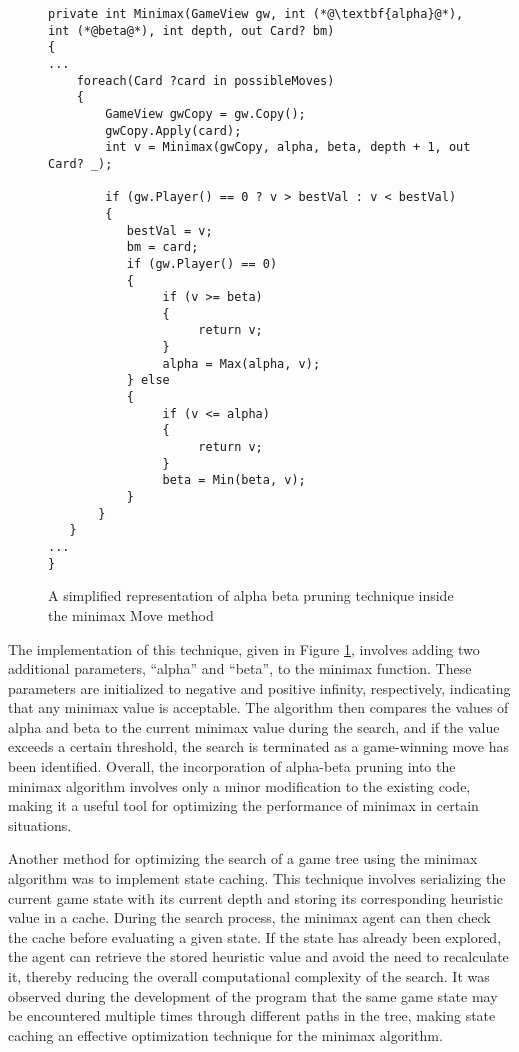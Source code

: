 \begin{figure}[h]
\captionsetup{justification=centering}
\begin{lstlisting}[frame=single]
private int Minimax(GameView gw, int (*@\textbf{alpha}@*), int (*@beta@*), int depth, out Card? bm)
{
...
    foreach(Card ?card in possibleMoves)
    {
        GameView gwCopy = gw.Copy();
        gwCopy.Apply(card);
        int v = Minimax(gwCopy, alpha, beta, depth + 1, out Card? _);

        if (gw.Player() == 0 ? v > bestVal : v < bestVal)
        {
           bestVal = v;
           bm = card;
           if (gw.Player() == 0)
           {
                if (v >= beta)
                {
                     return v;
                }
                alpha = Max(alpha, v);
           } else
           {
                if (v <= alpha)
                {
                     return v;
                }
                beta = Min(beta, v);
           }
       }
   }
...
}
\end{lstlisting}
\caption{A simplified representation of alpha beta pruning technique inside the minimax Move method}
\label{fig:alphabeta}
\end{figure}

The implementation of this technique, given in Figure \ref{fig:alphabeta}, involves adding two additional parameters, ``alpha'' and ``beta'', to the minimax function. These parameters are initialized to negative and positive infinity, respectively, indicating that any minimax value is acceptable. The algorithm then compares the values of alpha and beta to the current minimax value during the search, and if the value exceeds a certain threshold, the search is terminated as a game-winning move has been identified. Overall, the incorporation of alpha-beta pruning into the minimax algorithm involves only a minor modification to the existing code, making it a useful tool for optimizing the performance of minimax in certain situations.

Another method for optimizing the search of a game tree using the minimax algorithm was to implement state caching. This technique involves serializing the current game state with its current depth and storing its corresponding heuristic value in a cache. During the search process, the minimax agent can then check the cache before evaluating a given state. If the state has already been explored, the agent can retrieve the stored heuristic value and avoid the need to recalculate it, thereby reducing the overall computational complexity of the search. It was observed during the development of the program that the same game state may be encountered multiple times through different paths in the tree, making state caching an effective optimization technique for the minimax algorithm.



